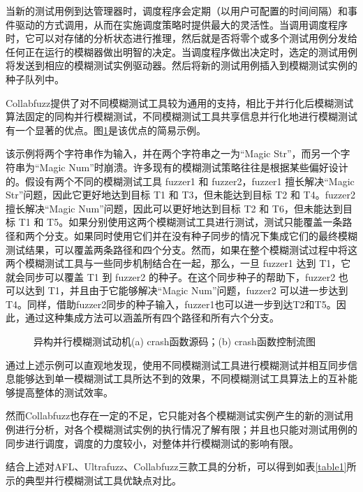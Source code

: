 \documentclass[master]{thesis-uestc}
\begin{document}
当新的测试用例到达管理器时，调度程序会定期（以用户可配置的时间间隔）和事件驱动的方式调用，从而在实施调度策略时提供最大的灵活性。当调用调度程序时，它可以对存储的分析状态进行推理，然后就是否将零个或多个测试用例分发给任何正在运行的模糊器做出明智的决定。当调度程序做出决定时，选定的测试用例将发送到相应的模糊测试实例驱动器。然后将新的测试用例插入到模糊测试实例的种子队列中。

Collabfuzz提供了对不同模糊测试工具较为通用的支持，相比于并行化后模糊测试算法固定的同构并行模糊测试，不同模糊测试工具共享信息并行化地进行模糊测试有一个显著的优点。图\ref{motivation}是该优点的简易示例。

该示例将两个字符串作为输入，并在两个字符串之一为“Magic Str”，而另一个字符串为“Magic Num”时崩溃。许多现有的模糊测试策略往往是根据某些偏好设计的。假设有两个不同的模糊测试工具 fuzzer1 和 fuzzer2，fuzzer1 擅长解决“Magic Str”问题，因此它更好地达到目标 T1 和 T3，但未能达到目标 T2 和 T4。fuzzer2 擅长解决“Magic Num”问题，因此可以更好地达到目标 T2 和 T6，但未能达到目标 T1 和 T5。如果分别使用这两个模糊测试工具进行测试，测试只能覆盖一条路径和两个分支。如果同时使用它们并在没有种子同步的情况下集成它们的最终模糊测试结果，可以覆盖两条路径和四个分支。然而，如果在整个模糊测试过程中将这两个模糊测试工具与一些同步机制结合在一起，那么，一旦 fuzzer1 达到 T1，它就会同步可以覆盖 T1 到 fuzzer2 的种子。在这个同步种子的帮助下，fuzzer2 也可以达到 T1，并且由于它能够解决“Magic Num”问题，fuzzer2 可以进一步达到 T4。同样，借助fuzzer2同步的种子输入，fuzzer1也可以进一步到达T2和T5。因此，通过这种集成方法可以涵盖所有四个路径和所有六个分支。

\begin{figure}[!htbp]
    \vspace{6pt}
    \quad
    \caption{异构并行模糊测试动机(a) crash函数源码；(b) crash函数控制流图}
    \label{motivation}
\end{figure}

通过上述示例可以直观地发现，使用不同模糊测试工具进行模糊测试并相互同步信息能够达到单一模糊测试工具所达不到的效果，不同模糊测试工具算法上的互补能够提高整体的测试效率。

然而Collabfuzz也存在一定的不足，它只能对各个模糊测试实例产生的新的测试用例进行分析，对各个模糊测试实例的执行情况了解有限；并且也只能对测试用例的同步进行调度，调度的力度较小，对整体并行模糊测试的影响有限。


结合上述对AFL、Ultrafuzz、Collabfuzz三款工具的分析，可以得到如表\ref{table1}所示的典型并行模糊测试工具优缺点对比。
\end{document}
